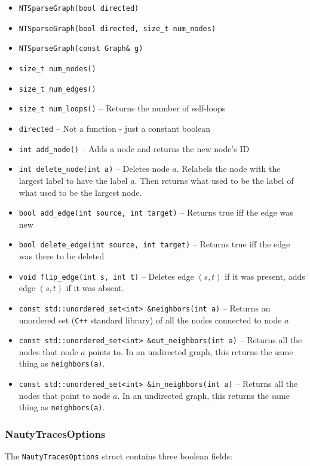 \documentclass{article}
\begin{document}
\begin{itemize}
    \setlength\itemsep{-0.1em}
    \item \verb|NTSparseGraph(bool directed)|
    \item \verb|NTSparseGraph(bool directed, size_t num_nodes)|
    \item \verb|NTSparseGraph(const Graph& g)|
    \item \verb|size_t num_nodes()|
    \item \verb|size_t num_edges()|
    \item \verb|size_t num_loops()| -- Returns the number of self-loops
    \item \verb|directed| -- Not a function - just a constant boolean
    \item \verb|int add_node()| -- Adds a node and returns the new node's ID
    \item \verb|int delete_node(int a)| -- Deletes node $a$. Relabels the node with the largest label to have the label $a$. Then returns what used to be the label of what used to be the largest node.
    \item \verb|bool add_edge(int source, int target)| -- Returns true iff the edge was new
    \item \verb|bool delete_edge(int source, int target)| -- Returns true iff the edge was there to be deleted
    \item \verb|void flip_edge(int s, int t)| -- Deletes edge $(s, t)$ if it was present, adds edge $(s, t)$ if it was absent.
    \item \verb|const std::unordered_set<int> &neighbors(int a)| -- Returns an unordered set (\verb|C++| standard library) of all the nodes connected to node $a$
    \item \verb|const std::unordered_set<int> &out_neighbors(int a)| -- Returns all the nodes that node $a$ points to. In an undirected graph, this returns the same thing as \verb|neighbors(a)|.
    \item \verb|const std::unordered_set<int> &in_neighbors(int a)| -- Returns all the nodes that point to node $a$. In an undirected graph, this returns the same thing as \verb|neighbors(a)|.
\end{itemize}

\subsubsection{NautyTracesOptions}

The \verb|NautyTracesOptions| struct contains three boolean fields:
\end{document}
